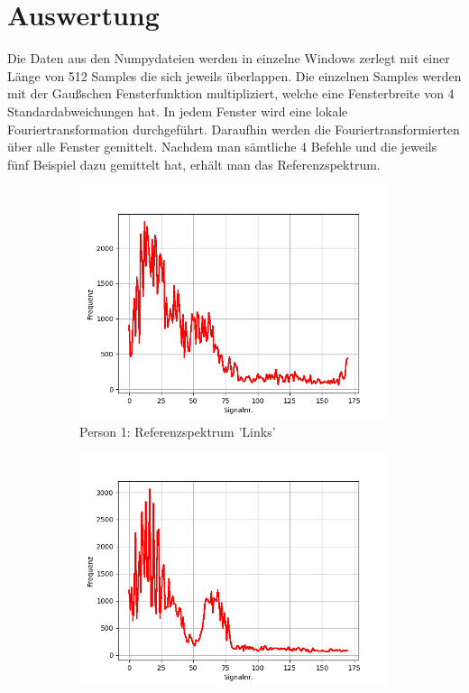 \documentclass[12pt, oneside, a4paper, \docLanguage]{report}
\begin{document}
\section{Auswertung}
\label{chap:VERSUCH_2_AUSWERTUNG}
Die Daten aus den Numpydateien werden in einzelne Windows zerlegt mit einer Länge von 512 Samples die sich jeweils überlappen.
\newline
Die einzelnen Samples werden mit der Gaußschen Fensterfunktion multipliziert, welche eine Fensterbreite von 4 Standardabweichungen hat.
In jedem Fenster wird eine lokale Fouriertransformation durchgeführt.
Daraufhin werden die Fouriertransformierten über alle Fenster gemittelt.
\newline
Nachdem man sämtliche 4 Befehle und die jeweils fünf Beispiel dazu gemittelt hat, erhält man das Referenzspektrum.
\begin{figure}[H]
\centering
	\begin{subfigure}{.5\textwidth}
  		\centering
 		 \includegraphics[width=.95\linewidth]{../data/img/Versuch2/2Averagelinks.png}
  		\caption{Person 1: Referenzspektrum 'Links'}
 		 \label{fig:sub1}
	\end{subfigure}%
	\begin{subfigure}{.5\textwidth}
  		\centering
 		 \includegraphics[width=.95\linewidth]{../data/img/Versuch2/2Averagerechts.png}

\end{subfigure}
\end{figure}
\end{document}
